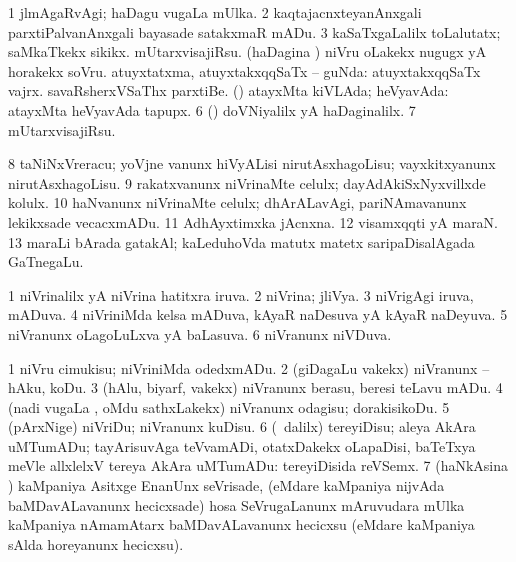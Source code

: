 {\noindent 
\gl{\pagu}
\expl{}
\bmng
\bnum
\num{1}  jlmAgaRvAgi; haDagu \mo vugaLa mUlka. 
\num{2}  kaqtajacnxteyanAnxgali parxtiPalvanAnxgali bayasade satakxmaR mADu. 
\num{3}  kaSaTxgaLalilx toLalutatx; saMkaTkekx sikikx. 
  
\banum
{} mUtarxvisajiRsu. 
 (haDagina \vi) niVru oLakekx nugugx yA horakekx soVru. 
\eanum
\numie
{}  
\banum
{} atuyxtatxma, atuyxtakxqqSaTx -- guNda:  atuyxtakxqqSaTx vajrx.  savaRsherxVSaThx parxtiBe. 
 (\hiV) atayxMta kiVLAda; heVyavAda:  atayxMta heVyavAda tapupx. 
\eanum
\numie
\num{6}  (\rUpa) doVNiyalilx yA haDaginalilx. 
\num{7}  mUtarxvisajiRsu. 
\num{8}  taNiNxVreracu; yoVjne \mo vanunx hiVyALisi nirutAsxhagoLisu; vayxkitxyanunx nirutAsxhagoLisu. 
\num{9}  rakatxvanunx niVrinaMte celulx; dayAdAkiSxNyxvillxde kolulx. 
\num{10}  haNvanunx niVrinaMte celulx; dhArALavAgi, pariNAmavanunx lekikxsade vecacxmADu. 
\num{11}  AdhAyxtimxka jAcnxna. 
\num{12}  visamxqqti yA maraN. 
\num{13}  maraLi bArada gatakAl; kaLeduhoVda matutx matetx saripaDisalAgada GaTnegaLu. 
\enum
\emng
\eentry

\bentry
{} 
\gl{\gu}
\expl{}
\bmng
\bnum
\num{1} niVrinalilx yA niVrina hatitxra iruva. 
\num{2} niVrina; jliVya. 
\num{3} niVrigAgi iruva, mADuva. 
\num{4} niVriniMda kelsa mADuva, kAyaR naDesuva yA kAyaR naDeyuva. 
\num{5} niVranunx oLagoLuLxva yA baLasuva.
\num{6} niVranunx niVDuva. 
\enum
\emng
\eentry

\bentry
{} 
\gl{\sakirx}
\expl{}
\bmng
\bnum
\num{1} niVru cimukisu; niVriniMda odedxmADu. 
\num{2} (giDagaLu \mo vakekx) niVranunx -- hAku, koDu. 
\num{3} (hAlu, biyarf, \mo vakekx) niVranunx berasu, beresi teLavu mADu. 
\num{4} (nadi \mo vugaLa \vi, oMdu sathxLakekx) niVranunx odagisu; dorakisikoDu. 
\num{5} (pArxNige) niVriDu; niVranunx kuDisu. 
\num{6} (\kanmu\ \BUkaq dalilx) tereyiDisu; aleya AkAra uMTumADu; tayArisuvAga teVvamADi, otatxDakekx oLapaDisi, baTeTxya meVle allxlelxV tereya AkAra uMTumADu:  tereyiDisida reVSemx. 
\num{7} (haNkAsina \vi) kaMpaniya Asitxge EnanUnx seVrisade, (eMdare kaMpaniya nijvAda baMDavALavanunx hecicxsade) hosa SeVrugaLanunx mAruvudara mUlka kaMpaniya nAmamAtarx baMDavALavanunx hecicxsu (eMdare kaMpaniya sAlda horeyanunx hecicxsu). 
\enum
\emng

}

